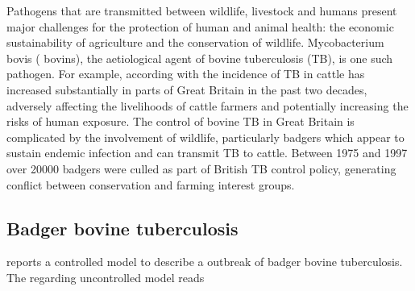Pathogens that are transmitted between wildlife, livestock and humans present
major challenges for the protection of human and animal health: the economic
sustainability of agriculture and the conservation of wildlife. Mycobacterium
bovis ({\color{red} bovins}), the aetiological agent of bovine tuberculosis (TB), is one such pathogen.
For example, according with \citet{Donnelly2003} the incidence of TB in cattle 
has increased substantially in parts of Great Britain in the past two decades, 
adversely affecting the livelihoods of cattle farmers and potentially 
increasing the risks of human exposure. The control of bovine TB in Great 
Britain is complicated by the involvement of wildlife, particularly badgers 
which appear to sustain endemic infection and can transmit TB to cattle. 
Between \num{1975} and \num{1997} over \num{20000} badgers were
culled as part of British TB control policy, generating conflict between
conservation and farming interest groups.

\subsection*{Badger bovine tuberculosis}
\citet{Bolzoni2014} reports a controlled model to describe a outbreak of badger 
bovine tuberculosis. The regarding uncontrolled model reads

